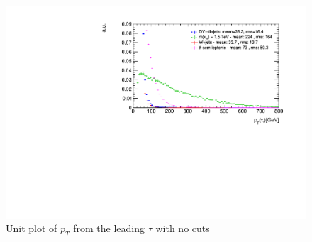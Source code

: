 \begin{figure}[H]
\centering
\includegraphics[width=1.2\linewidth]{Figures/Plots/tau1_pT_unitNoCuts}
\caption{Unit plot of $p_{T}$ from the leading $\tau$ with no cuts}
\label{fig: tau1pTunitNC}
\end{figure}
